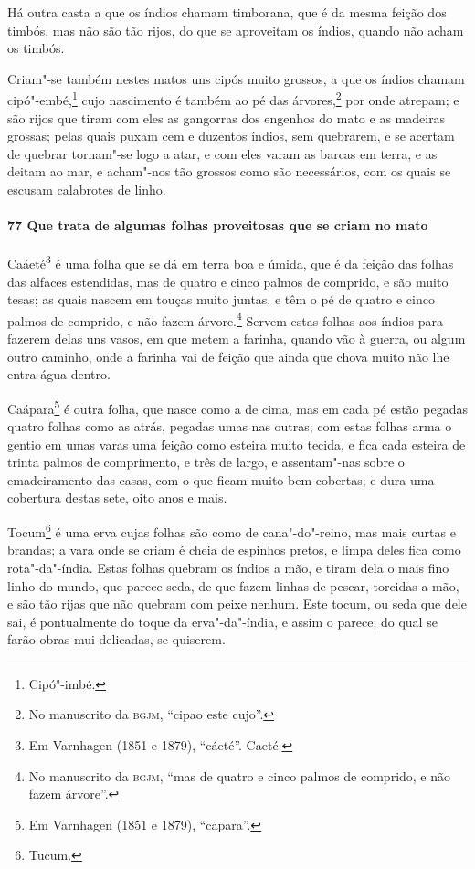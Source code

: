 Há outra casta a que os índios chamam timborana, que é da mesma feição dos timbós, mas não
são tão rijos, do que se aproveitam os índios, quando não acham os timbós.

Criam"-se também nestes matos uns cipós muito grossos, a que os índios chamam
cipó"-embé,\footnote{ Cipó"-imbé.} cujo nascimento é também ao pé das árvores,\footnote{ No
manuscrito da \textsc{bgjm}, ``cipao este cujo''.} por onde atrepam; e são rijos que tiram
com eles as gangorras dos engenhos do mato e as madeiras grossas; pelas quais puxam cem e
duzentos índios, sem quebrarem, e se acertam de quebrar tornam"-se logo a atar, e com eles
varam as barcas em terra, e as deitam ao mar, e acham"-nos tão grossos como são
necessários, com os quais se escusam calabrotes de linho.

\paragraph{77 Que trata de algumas folhas proveitosas que se criam no mato}

Caáeté\footnote{ Em Varnhagen (1851 e 1879), ``cáeté''. Caeté.} é uma folha que se dá em
terra boa e úmida, que é da feição das folhas das alfaces estendidas, mas de quatro e
cinco palmos de comprido, e são muito tesas; as quais nascem em touças muito juntas, e têm
o pé de quatro e cinco palmos de comprido, e não fazem árvore.\footnote{ No manuscrito da
\textsc{bgjm}, ``mas de quatro e cinco palmos de comprido, e não fazem árvore''.} Servem
estas folhas aos índios para fazerem delas uns vasos, em que metem a farinha, quando vão à
guerra, ou algum outro caminho, onde a farinha vai de feição que ainda que chova muito não
lhe entra água dentro.

Caápara\footnote{ Em Varnhagen (1851 e 1879), ``capara''.} é outra folha, que nasce como a
de cima, mas em cada pé estão pegadas quatro folhas como as atrás, pegadas umas nas
outras; com estas folhas arma o gentio em umas varas uma feição como esteira muito tecida,
e fica cada esteira de trinta palmos de comprimento, e três de largo, e assentam"-nas sobre
o emadeiramento das casas, com o que ficam muito bem cobertas; e dura uma cobertura destas
sete, oito anos e mais.

Tocum\footnote{ Tucum.} é uma erva cujas folhas são como de cana"-do"-reino, mas mais curtas
e brandas; a vara onde se criam é cheia de espinhos pretos, e limpa deles fica como
rota"-da"-índia. Estas folhas quebram os índios a mão, e tiram dela o mais fino linho do
mundo, que parece seda, de que fazem linhas de pescar, torcidas a mão, e são tão rijas que
não quebram com peixe nenhum. Este tocum, ou seda que dele sai, é pontualmente do toque da
erva"-da"-índia, e assim o parece; do qual se farão obras mui delicadas, se quiserem.

